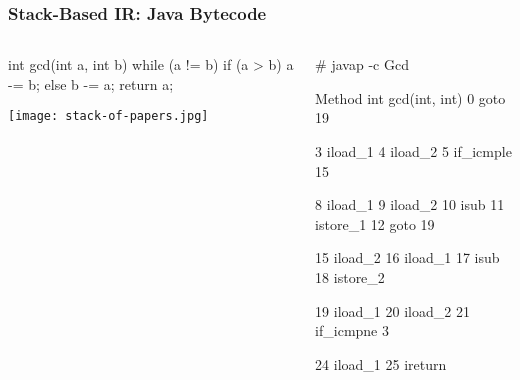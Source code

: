 \documentclass{plt}
\begin{document}
\begin{frame}[fragile]
  \frametitle{Stack-Based IR: Java Bytecode}

  \begin{columns}
    \begin{column}{0.45\textwidth}

\begin{java}
int gcd(int a, int b) {
  while (a != b) {
    if (a > b)
      a -= b;
    else
      b -= a;
  }
  return a;
}
\end{java}

\vspace{2pc}

\texttt{[image: stack-of-papers.jpg]}
    \end{column}
    \begin{column}{0.55\textwidth}
\fontsize{8}{8}\selectfont
\begin{semiverbatim}
# javap -c Gcd

Method int gcd(int, int)
   0 goto 19

   3 iload_1               
   4 iload_2      
   5 if_icmple 15 

   8 iload_1            
   9 iload_2      
  10 isub         
  11 istore_1     
  12 goto 19

  15 iload_2      
  16 iload_1        
  17 isub         
  18 istore_2     

  19 iload_1      
  20 iload_2      
  21 if_icmpne 3  

  24 iload_1      
  25 ireturn      
\end{semiverbatim}
    \end{column}
  \end{columns}

\end{frame}
\end{document}
